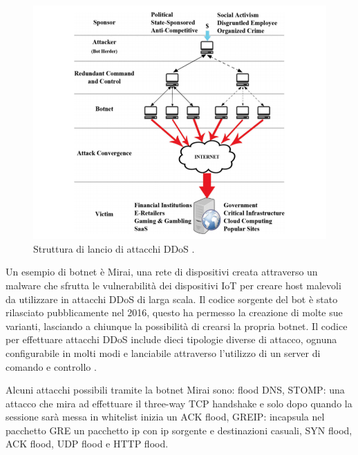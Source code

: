 \begin{figure}[h]
    \includegraphics[width=\hsize]{images/introduzione/struttura_botnets_2.png}
    \caption{Struttura di lancio di attacchi DDoS \cite{ddos_survey_4}.}
    \centering
\end{figure}

Un esempio di botnet è Mirai, una rete di dispositivi creata attraverso un malware che sfrutta le vulnerabilità dei dispositivi IoT per creare host malevoli da utilizzare in attacchi DDoS di larga scala. Il codice sorgente del bot è stato rilasciato pubblicamente nel 2016, questo ha permesso la creazione di molte sue varianti, lasciando a chiunque la possibilità  di crearsi la propria botnet.
Il codice per effettuare attacchi DDoS include dieci tipologie diverse di attacco, ognuna configurabile in molti modi e lanciabile attraverso l'utilizzo di un server di comando e controllo \cite{slide_mirai}.

Alcuni attacchi possibili tramite la botnet Mirai sono: flood DNS, STOMP: una attacco che mira ad effettuare il three-way TCP handshake e solo dopo quando la sessione sarà messa in whitelist inizia un ACK flood, GREIP: incapsula nel pacchetto GRE un pacchetto ip con ip sorgente e destinazioni casuali, SYN flood, ACK flood, UDP flood e HTTP flood.


